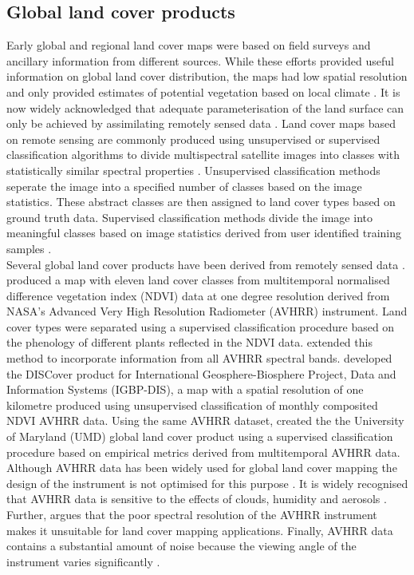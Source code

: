 \documentclass{icldt}\usepackage[]{graphicx}\usepackage[]{color}
\begin{document}
\subsection{Global land cover products}

Early global and regional land cover maps \citep{Olson1983,Matthews1983,Wilson1985} were based on field surveys and ancillary information from different sources. While these efforts provided useful information on global land cover distribution, the maps had low spatial resolution and only provided estimates of potential vegetation based on local climate \citep{Friedl2002}. It is now widely acknowledged that adequate parameterisation of the land surface can only be achieved by assimilating remotely sensed data \citep{Sellers1997,Friedl2002}. Land cover maps based on remote sensing are commonly produced using unsupervised or supervised classification algorithms to divide multispectral satellite images into classes with statistically similar spectral properties \citep{Nemani1997}. Unsupervised classification methods seperate the image into a specified number of classes based on the image statistics. These abstract classes are then assigned to land cover types based on ground truth data. Supervised classification methods divide the image into meaningful classes based on image statistics derived from user identified training samples \citep{Neteler2008}. \\

Several global land cover products have been derived from remotely sensed data \citep{Herold2008}. \citet{Defries1994} produced a map with eleven land cover classes from multitemporal normalised difference vegetation index (NDVI) data at one degree resolution derived from NASA's Advanced Very High Resolution Radiometer (AVHRR) instrument. Land cover types were separated using a supervised classification procedure based on the phenology of different plants reflected in the NDVI data. \citet{Defries1998} extended this method to incorporate  information from all AVHRR spectral bands. \citet{Loveland2000} developed the DISCover product for International Geosphere-Biosphere Project, Data and Information Systems (IGBP-DIS), a map with a spatial resolution of one kilometre produced using unsupervised classification of monthly composited NDVI AVHRR data. Using the same AVHRR dataset, \citet{Hansen2000} created the the University of Maryland (UMD) global land cover product using a supervised classification procedure based on empirical metrics derived from multitemporal AVHRR data. Although AVHRR data has been widely used for global land cover mapping the design of the instrument is not optimised for this purpose \citep{Friedl2002}. It is widely recognised that AVHRR data is sensitive to the effects of clouds, humidity and aerosols \citep[e.g.][]{Nemani1997,Loveland2000,Friedl2002}. Further, \citet{Friedl2000} argues that the poor spectral resolution of the AVHRR instrument makes it unsuitable for land cover mapping applications. Finally, AVHRR data contains a substantial amount of noise because the viewing angle of the instrument varies significantly \citep{Cihlar1994,Friedl2002}. \\
\end{document}
